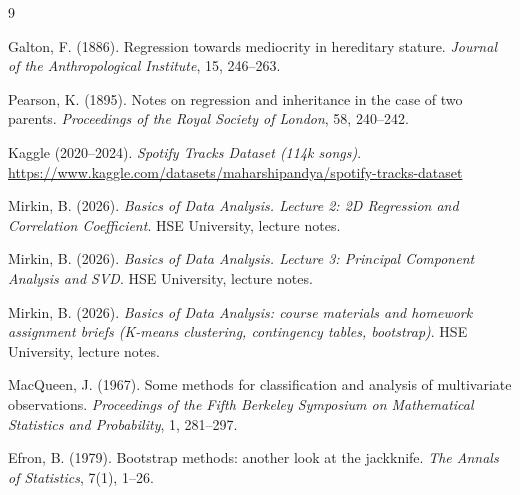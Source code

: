 \documentclass[11pt,letterpaper]{article}
\begin{document}
{}

\begin{thebibliography}{9}

Galton, F. (1886).
\newblock Regression towards mediocrity in hereditary stature.
\newblock \textit{Journal of the Anthropological Institute}, 15, 246--263.

Pearson, K. (1895).
\newblock Notes on regression and inheritance in the case of two parents.
\newblock \textit{Proceedings of the Royal Society of London}, 58, 240--242.

Kaggle (2020--2024).
\newblock \textit{Spotify Tracks Dataset (114k songs)}.
\newblock \url{https://www.kaggle.com/datasets/maharshipandya/spotify-tracks-dataset}

Mirkin, B. (2026).
\newblock \textit{Basics of Data Analysis. Lecture 2: 2D Regression and
  Correlation Coefficient}.
\newblock HSE University, lecture notes.

Mirkin, B. (2026).
\newblock \textit{Basics of Data Analysis. Lecture 3: Principal Component
  Analysis and SVD}.
\newblock HSE University, lecture notes.

Mirkin, B. (2026).
\newblock \textit{Basics of Data Analysis: course materials and homework
  assignment briefs (K-means clustering, contingency tables, bootstrap)}.
\newblock HSE University, lecture notes.

MacQueen, J. (1967).
\newblock Some methods for classification and analysis of multivariate
  observations.
\newblock \textit{Proceedings of the Fifth Berkeley Symposium on Mathematical
  Statistics and Probability}, 1, 281--297.

Efron, B. (1979).
\newblock Bootstrap methods: another look at the jackknife.
\newblock \textit{The Annals of Statistics}, 7(1), 1--26.

\end{thebibliography}
\end{document}
